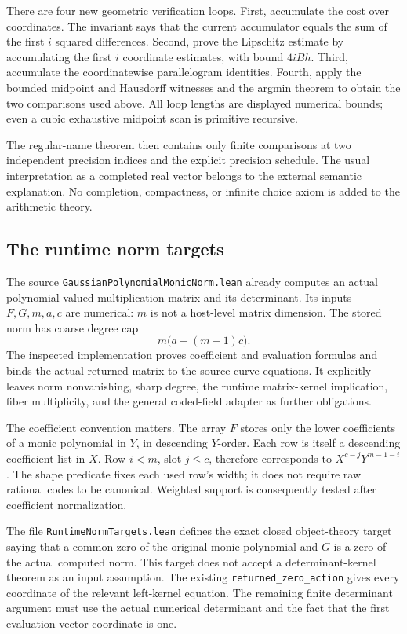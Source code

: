 There are four new geometric verification loops.  First, accumulate the
cost over coordinates.  The invariant says that the current accumulator
equals the sum of the first \(i\) squared differences.  Second, prove
the Lipschitz estimate by accumulating the first \(i\) coordinate
estimates, with bound \(4iBh\).  Third, accumulate the coordinatewise
parallelogram identities.  Fourth, apply the bounded midpoint and
Hausdorff witnesses and the argmin theorem to obtain the two comparisons
used above.  All loop lengths are displayed numerical bounds; even a
cubic exhaustive midpoint scan is primitive recursive.

The regular-name theorem then contains only finite comparisons at two
independent precision indices and the explicit precision schedule.
The usual interpretation as a completed real vector belongs to the
external semantic explanation.  No completion, compactness, or infinite
choice axiom is added to the arithmetic theory.

\subsection{The runtime norm targets}

The source \texttt{GaussianPolynomialMonicNorm.lean} already computes
an actual polynomial-valued multiplication matrix and its determinant.
Its inputs \(F,G,m,a,c\) are numerical: \(m\) is not a host-level matrix
dimension.  The stored norm has coarse degree cap
\[
 m\bigl(a+(m-1)c\bigr).
\]
The inspected implementation proves coefficient and evaluation formulas
and binds the actual returned matrix to the source curve equations.
It explicitly leaves norm nonvanishing, sharp degree, the runtime
matrix-kernel implication, fiber multiplicity, and the general coded-field
adapter as further obligations.

The coefficient convention matters.  The array \(F\) stores only the
lower coefficients of a monic polynomial in \(Y\), in descending
\(Y\)-order.  Each row is itself a descending coefficient list in
\(X\).  Row \(i<m\), slot \(j\leq c\), therefore corresponds to
\(X^{c-j}Y^{m-1-i}\).  The shape predicate fixes each used row's width;
it does not require raw rational codes to be canonical.  Weighted support
is consequently tested after coefficient normalization.

The file \texttt{RuntimeNormTargets.lean} defines the exact closed
object-theory target saying that a common zero of the original monic
polynomial and \(G\) is a zero of the actual computed norm.  This target
does not accept a determinant-kernel theorem as an input assumption.
The existing \texttt{returned\_zero\_action} gives every coordinate of
the relevant left-kernel equation.  The remaining finite determinant
argument must use the actual numerical determinant and the fact that
the first evaluation-vector coordinate is one.

